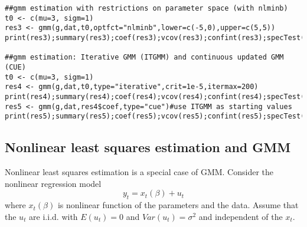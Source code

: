\documentclass{article}
\begin{document}
\begin{solution}
\begin{verbatim}
##gmm estimation with restrictions on parameter space (with nlminb)
t0 <- c(mu=3, sigm=1)
res3 <- gmm(g,dat,t0,optfct="nlminb",lower=c(-5,0),upper=c(5,5))
print(res3);summary(res3);coef(res3);vcov(res3);confint(res3);specTest(res3)

##gmm estimation: Iterative GMM (ITGMM) and continuous updated GMM (CUE)
t0 <- c(mu=3, sigm=1)
res4 <- gmm(g,dat,t0,type="iterative",crit=1e-5,itermax=200)
print(res4);summary(res4);coef(res4);vcov(res4);confint(res4);specTest(res4)
res5 <- gmm(g,dat,res4$coef,type="cue")#use ITGMM as starting values
print(res5);summary(res5);coef(res5);vcov(res5);confint(res5);specTest(res5)
\end{verbatim}
\end{solution}


\subsection{Nonlinear least squares estimation and GMM}

Nonlinear least squares estimation is a special case of GMM. Consider the
nonlinear regression model%
\begin{equation*}
y_{t}=x_{t}(\beta )+u_{t}
\end{equation*}%
where $x_{t}(\beta )$ is nonlinear function of the parameters and the data.
Assume that the $u_{t}$ are i.i.d. with $E(u_{t})=0$ and $Var(u_{t})=\sigma
^{2}$ and independent of the $x_{t}$.

\end{document}
